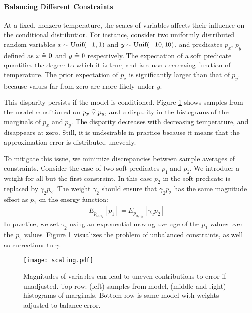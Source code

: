 \paragraph{Balancing Different Constraints}
At a fixed, nonzero temperature, the scales of variables affects their influence on
the conditional distribution.
For instance, consider two uniformly distributed random variables $x \sim \operatorname{Unif}(-1, 1)$ and $y \sim \operatorname{Unif}(-10, 10)$,
and predicates $p_x$, $p_y$ defined as $x \mathrel{\tilde{=}} 0$ and $y \mathrel{\tilde{=}} 0$ respectively.
The expectation of a soft predicate quantifies the degree to which it is true, and is a non-decreasing function of temperature.
The prior expectation of $p_x$ is significantly larger than that of $p_y$.
because values far from zero are more likely under $y$.

This disparity persists if the model is conditioned.
Figure \ref{scaling} shows samples from the model conditioned on $p_x \mathrel{\tilde{\lor}} p_y$, and a disparity in the histograms of the marginals of $p_x$ and $p_y$.
The disparity decreases with decreasing temperature, and disappears at zero.
Still, it is undesirable in practice because it means that the approximation error is distributed unevenly.

To mitigate this issue, we minimize discrepancies between sample averages of constraints.
Consider the case of two 
soft predicates $p_1$ and $p_2$. We introduce a weight for all but the first constraint.
In this case $p_2$ in the soft predicate is replaced
by $\gamma_2 p_2$. The weight $\gamma_2$ should
ensure that $\gamma_2 p_2$ has the same
magnitude effect as $p_1$ on the energy
function:
\begin{align*}
E_{p_{\alpha, \gamma_2}}[p_1] = E_{p_{\alpha, \gamma_2}}[\gamma_2 p_2] 
\end{align*}
In practice, we set $\gamma_2$ using an exponential moving
average of the $p_1$ values over the $p_2$ values.
Figure \ref{scaling} visualizes the problem of unbalanced constraints, as well as corrections to $\gamma$.


\begin{figure}
  \centering
  \texttt{[image: scaling.pdf]}
  \caption{Magnitudes of variables can lead to uneven contributions to error if unadjusted.  Top row: (left) samples from model, (middle and right) histograms of marginals.  Bottom row is same model with weights adjusted to balance error.}\label{scaling}
  \end{figure}

